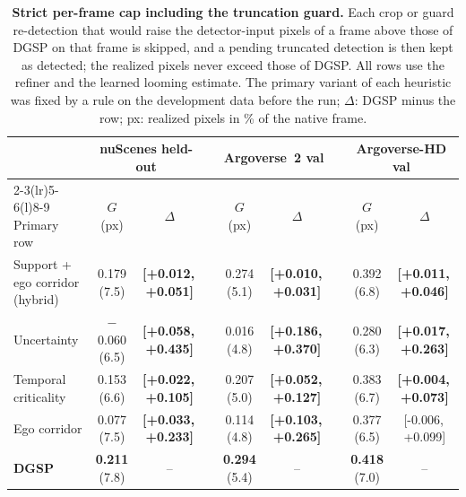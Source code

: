 \documentclass[10pt,letterpaper]{article}
\newcommand{\method}{DGSP\xspace}
\newcommand{\G}{G}
\newcommand{\ci}[2]{[#1,\allowbreak\,#2]}
\newcommand{\best}[1]{\textbf{#1}}
\newcommand{\oursrow}{\rowcolor{oursbg}}
\newcommand{\na}{--}
\theoremstyle{remark}
\theoremstyle{plain}
\theoremstyle{definition}
\begin{document}
\begin{table}[!htbp]
\centering
\caption{\textbf{Strict per-frame cap including the truncation guard.} Each crop or guard re-detection that would raise the detector-input pixels of a frame above those of \method on that frame is skipped, and a pending truncated detection is then kept as detected; the realized pixels never exceed those of \method. All rows use the refiner and the learned looming estimate. The primary variant of each heuristic was fixed by a rule on the development data before the run; $\Delta$: \method minus the row; px: realized pixels in \% of the native frame.}
\label{tab:strictcap}
\small
\setlength{\tabcolsep}{3pt}
\begin{tabular}{@{}lcccccccc@{}}
\toprule
 & \multicolumn{2}{c}{nuScenes held-out} & & \multicolumn{2}{c}{Argoverse~2 val} & & \multicolumn{2}{c}{Argoverse-HD val} \\
\cmidrule(lr){2-3}\cmidrule(lr){5-6}\cmidrule(l){8-9}
Primary row & $\G$ (px) & $\Delta$ & & $\G$ (px) & $\Delta$ & & $\G$ (px) & $\Delta$ \\
\midrule
Support + ego corridor (hybrid) & 0.179 (7.5) & \best{\ci{+0.012}{+0.051}} & & 0.274 (5.1) & \best{\ci{+0.010}{+0.031}} & & 0.392 (6.8) & \best{\ci{+0.011}{+0.046}} \\
Uncertainty & $-$0.060 (6.5) & \best{\ci{+0.058}{+0.435}} & & 0.016 (4.8) & \best{\ci{+0.186}{+0.370}} & & 0.280 (6.3) & \best{\ci{+0.017}{+0.263}} \\
Temporal criticality & 0.153 (6.6) & \best{\ci{+0.022}{+0.105}} & & 0.207 (5.0) & \best{\ci{+0.052}{+0.127}} & & 0.383 (6.7) & \best{\ci{+0.004}{+0.073}} \\
Ego corridor & 0.077 (7.5) & \best{\ci{+0.033}{+0.233}} & & 0.114 (4.8) & \best{\ci{+0.103}{+0.265}} & & 0.377 (6.5) & \ci{-0.006}{+0.099} \\
\midrule
\oursrow \textbf{\method} & \textbf{0.211} (7.8) & \na & & \textbf{0.294} (5.4) & \na & & \textbf{0.418} (7.0) & \na \\
\bottomrule
\end{tabular}
\end{table}
\end{document}
